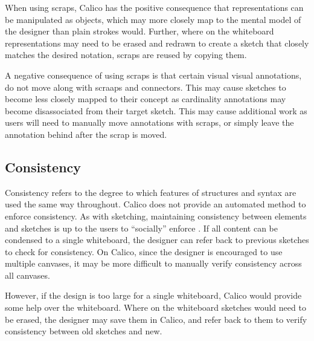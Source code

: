 When using scraps, Calico has the positive consequence that representations can be manipulated as objects, which may more closely map to the mental model of the designer than plain strokes would. Further, where on the whiteboard representations may need to be erased and redrawn to create a sketch that closely matches the desired notation, scraps are reused by copying them. 

A negative consequence of using scraps is that certain visual visual annotations, do not move along with scraaps and connectors. This may cause sketches to become less closely mapped to their concept as cardinality annotations may become disassociated from their target sketch. This may cause additional work as users will need to manually move annotations with scraps, or simply leave the annotation behind after the scrap is moved. 

%

\subsection{Consistency}
Consistency refers to the degree to which features of structures and syntax are used the same way throughout. Calico does not provide an automated method to enforce consistency. As with sketching, maintaining consistency between elements and sketches is up to the users to ``socially'' enforce \cite{Petre2013BookChapter}. If all content can be condensed to a single whiteboard, the designer can refer back to previous sketches to check for consistency. On Calico, since the designer is encouraged to use multiple canvases, it may be more difficult to manually verify consistency across all canvases.

However, if the design is too large for a single whiteboard, Calico would provide some help over the whiteboard. Where on the whiteboard sketches would need to be erased, the designer may save them in Calico, and refer back to them to verify consistency between old sketches and new.


